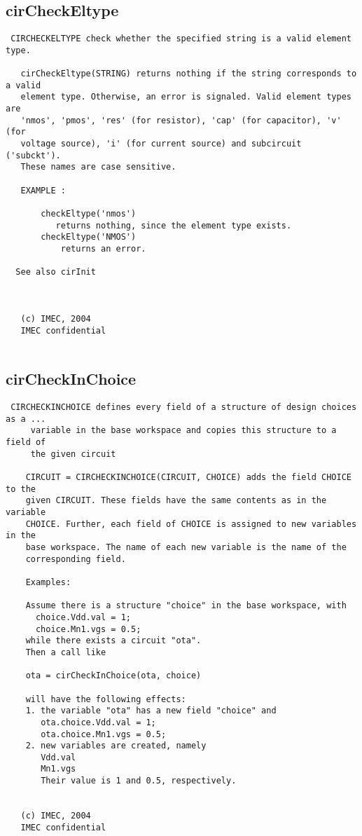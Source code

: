 \subsection{cirCheckEltype}
\label{sec:cirCheckEltype}
\begin{verbatim}
 CIRCHECKELTYPE check whether the specified string is a valid element type.
 
   cirCheckEltype(STRING) returns nothing if the string corresponds to a valid
   element type. Otherwise, an error is signaled. Valid element types are
   'nmos', 'pmos', 'res' (for resistor), 'cap' (for capacitor), 'v' (for
   voltage source), 'i' (for current source) and subcircuit ('subckt').
   These names are case sensitive.
 
   EXAMPLE :
  
       checkEltype('nmos')
          returns nothing, since the element type exists.
       checkEltype('NMOS')
           returns an error.
 
  See also cirInit
 
 
 
   (c) IMEC, 2004
   IMEC confidential 
 

\end{verbatim}

\newpage
\subsection{cirCheckInChoice}
\label{sec:cirCheckInChoice}
\begin{verbatim}
 CIRCHECKINCHOICE defines every field of a structure of design choices as a ...
     variable in the base workspace and copies this structure to a field of 
     the given circuit
 
    CIRCUIT = CIRCHECKINCHOICE(CIRCUIT, CHOICE) adds the field CHOICE to the
    given CIRCUIT. These fields have the same contents as in the variable
    CHOICE. Further, each field of CHOICE is assigned to new variables in the
    base workspace. The name of each new variable is the name of the
    corresponding field.
 
    Examples:
 
    Assume there is a structure "choice" in the base workspace, with
      choice.Vdd.val = 1;
      choice.Mn1.vgs = 0.5;
    while there exists a circuit "ota".
    Then a call like
 
    ota = cirCheckInChoice(ota, choice)
 
    will have the following effects:
    1. the variable "ota" has a new field "choice" and
       ota.choice.Vdd.val = 1;
       ota.choice.Mn1.vgs = 0.5;
    2. new variables are created, namely
       Vdd.val 
       Mn1.vgs
       Their value is 1 and 0.5, respectively.
 
 
   (c) IMEC, 2004
   IMEC confidential 
 

\end{verbatim}

